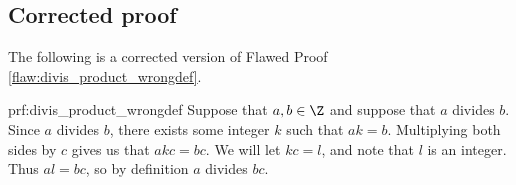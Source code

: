 \clearpage
\subsection{Corrected proof}

The following is a corrected version of Flawed Proof \ref{flaw:divis_product_wrongdef}. %

\begin{prf}{prf:divis_product_wrongdef} %
Suppose that $a,b \in \Z$ and suppose that $a$ divides $b$.
Since $a$ divides $b$, there exists some integer $k$ such that $ak = b$. Multiplying both sides by $c$ gives us that $akc = bc$. We will let $kc = l$, and note that $l$ is an integer. Thus $al = bc$, so by definition $a$ divides $bc$. 
\end{prf}